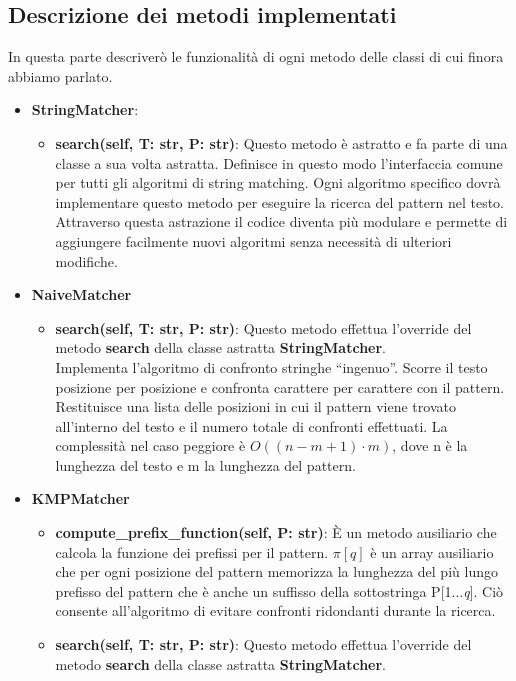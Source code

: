 \documentclass{article}
\begin{document}
\subsection{Descrizione dei metodi implementati}
In questa parte descriverò le funzionalità di ogni metodo delle classi di cui finora abbiamo parlato.
\begin{itemize}
    \item \textbf{StringMatcher}:
    \begin{itemize}
        \item \textbf{search(self, T: str, P: str)}: Questo metodo è astratto e fa parte di una classe a sua volta astratta. Definisce in questo modo l'interfaccia comune per tutti gli algoritmi di string matching. Ogni algoritmo specifico dovrà implementare questo metodo per eseguire la ricerca del pattern nel testo.\\
        Attraverso questa astrazione il codice diventa più modulare e permette di aggiungere facilmente nuovi algoritmi senza necessità di ulteriori modifiche.
    \end{itemize}
    \item \textbf{NaiveMatcher}
    \begin{itemize}
        \item \textbf{search(self, T: str, P: str)}: Questo metodo effettua l'override del metodo \textbf{search} della classe astratta \textbf{StringMatcher}.\\
        Implementa l'algoritmo di confronto stringhe ``ingenuo''. Scorre il testo posizione per posizione e confronta carattere per carattere con il pattern.
        Restituisce una lista delle posizioni in cui il pattern viene trovato all'interno del testo e il numero totale di confronti effettuati.
        La complessità nel caso peggiore è $O((n - m + 1) \cdot m)$, dove n è la lunghezza del testo e m la lunghezza del pattern.
    \end{itemize}
    \item \textbf{KMPMatcher}
    \begin{itemize}
        \item \textbf{compute\_prefix\_function(self, P: str)}: È un metodo ausiliario che calcola la funzione dei prefissi per il pattern. $\pi[q]$ è un array ausiliario che per ogni posizione del pattern memorizza la lunghezza del più lungo prefisso del pattern che è anche un suffisso della sottostringa P[1...\textit{q}]. Ciò consente all'algoritmo di evitare confronti ridondanti durante la ricerca.
        \item \textbf{search(self, T: str, P: str)}: Questo metodo effettua l'override del metodo \textbf{search} della classe astratta \textbf{StringMatcher}.\\

\end{itemize}
\end{itemize}
\end{document}
